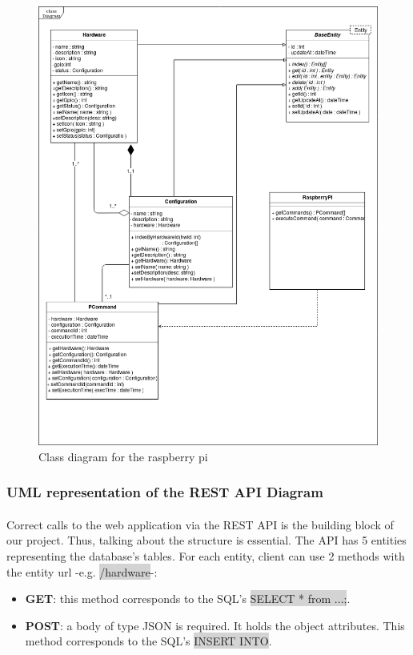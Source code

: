 \documentclass[12pt, oneside, a4paper]{book}
\newcommand{\code}[1]{{\color{red}\colorbox{lightgray}{#1}}}
\begin{document}
					\begin{figure}[H]
						\includegraphics[width=\linewidth]{img/diagram_class2.png}
						\caption{Class diagram for the raspberry pi}
						\label{fig:class_rp}
					\end{figure}
				\newpage\subsubsection{UML representation of the REST API Diagram}
				\paragraph{} Correct calls to the web application via the REST API is the building block of our project. Thus, talking about the structure is essential. The API has 5 entities representing the database's tables. For each entity, client can use 2 methods with the entity url -e.g. \code{/hardware}-: 
				\begin{itemize}
					\item \textbf{GET}: this method corresponds to the SQL's \code{SELECT * from ...;}.
					\item \textbf{POST}: a body of type JSON is required. It holds the object attributes. This method corresponds to the SQL's \code{INSERT INTO}.
				\end{itemize} 
\end{document}

